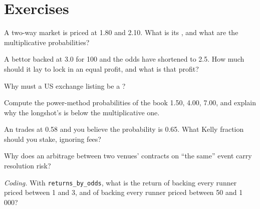 \section{Exercises}

\begin{exercise}[$\star$]\label{exo:m3:prediction-and-betting-markets:1}
A two-way market is priced at 1.80 and 2.10. What is its , and what are the multiplicative probabilities?
\end{exercise}

\begin{exercise}[$\star$]\label{exo:m3:prediction-and-betting-markets:2}
A bettor backed at 3.0 for 100 and the odds have shortened to 2.5. How much should it lay to lock in an equal profit, and what is that profit?
\end{exercise}

\begin{exercise}[$\star$]\label{exo:m3:prediction-and-betting-markets:3}
Why must a US exchange listing  be a ?
\end{exercise}

\begin{exercise}[$\star\star$]\label{exo:m3:prediction-and-betting-markets:4}
Compute the power-method probabilities of the book 1.50, 4.00, 7.00, and explain why the longshot's is below the multiplicative one.
\end{exercise}

\begin{exercise}[$\star\star$]\label{exo:m3:prediction-and-betting-markets:5}
An  trades at 0.58 and you believe the probability is 0.65. What Kelly fraction should you stake, ignoring fees?
\end{exercise}

\begin{exercise}[$\star\star$]\label{exo:m3:prediction-and-betting-markets:6}
Why does an arbitrage between two venues' contracts on ``the same'' event carry resolution risk?
\end{exercise}

\begin{exercise}[$\star\star\star$]\label{exo:m3:prediction-and-betting-markets:7}
\emph{Coding.} With \texttt{returns\_by\_odds}, what is the return of backing every runner priced between 1 and 3, and of backing every runner priced between
50 and 1\,000?
\end{exercise}

